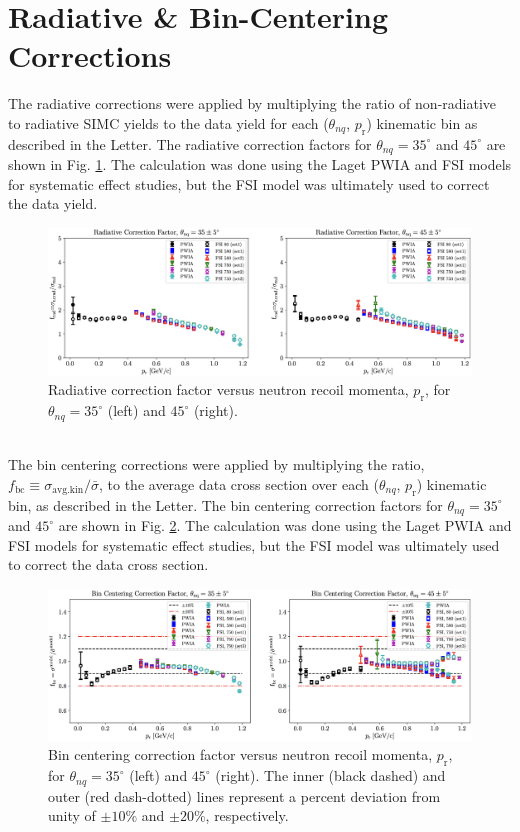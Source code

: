 \documentclass[aps, prl]{revtex4-2}  %
\begin{document}
\section{\large Radiative \& Bin-Centering Corrections}
\noindent The radiative corrections were applied by multiplying the ratio of non-radiative to radiative SIMC yields to the data yield for each ($\theta_{nq}$, $p_{\mathrm{r}}$)
kinematic bin as described in the Letter. The radiative correction factors for $\theta_{nq}=35^{\circ}$ and $45^{\circ}$ are shown in Fig. \ref{fig:fig9}. The calculation was done using the
Laget PWIA and FSI models for systematic effect studies, but the FSI model was ultimately used to correct the data yield.
\begin{figure}[!h]
\includegraphics[scale=0.40]{plots/RC_factor.png}
\caption{Radiative correction factor versus neutron recoil momenta, $p_{\mathrm{r}}$, for $\theta_{nq}=35^{\circ}$ (left) and $45^{\circ}$ (right). }
\label{fig:fig9}
\end{figure}\\
The bin centering corrections were applied by multiplying the ratio, $f_{\mathrm{bc}} \equiv \sigma_{\mathrm{avg.kin}}/\bar{\sigma}$, to the average data cross section over each ($\theta_{nq}$, $p_{\mathrm{r}}$)
kinematic bin, as described in the Letter. The bin centering correction factors for $\theta_{nq}=35^{\circ}$ and $45^{\circ}$ are shown in
Fig. \ref{fig:fig10}. The calculation was done using the Laget PWIA and FSI models for systematic effect studies, but the FSI model was ultimately used to correct the data cross section.
\begin{figure}[!h]
\includegraphics[scale=0.40]{plots/BC_factor.png}
\caption{Bin centering correction factor versus neutron recoil momenta, $p_{\mathrm{r}}$, for $\theta_{nq}=35^{\circ}$ (left) and $45^{\circ}$ (right).
  The inner (black dashed) and outer (red dash-dotted) lines represent a percent deviation from unity of $\pm10\%$ and $\pm20\%$, respectively.}
\label{fig:fig10}
\end{figure}
\end{document}
